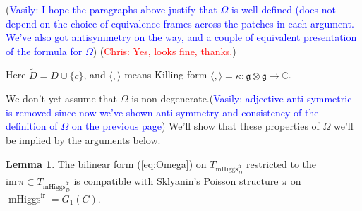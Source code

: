 \documentclass[11pt, oneside, reqno]{amsart}
\theoremstyle{definition} \newtheorem{definition}{Definition}[section]
\newtheorem{lemma}[definition]{Lemma}
\theoremstyle{definition} \newtheorem{remark}[definition]{Remark}
\theoremstyle{definition} \newtheorem{remarks}[definition]{Remarks}
\theoremstyle{definition} \newtheorem{question}[definition]{Question}
\theoremstyle{definition} \newtheorem*{note}{Note}
\theoremstyle{definition} \newtheorem{example}[definition]{Example}
\theoremstyle{definition} \newtheorem{examples}[definition]{Examples}
\renewcommand{\gg}{\mathfrak{g}}
\DeclareMathOperator{\mhiggs}{mHiggs}
\newcommand{\fr}{\mathrm{fr}}
\newcommand{\chris}[1]{(\textcolor{red}{Chris: #1})}
\newcommand{\vasily}[1]{(\textcolor{blue}{Vasily: #1})}
\begin{document}
\vasily{I hope the paragraphs above justify that $\Omega$ is well-defined
  (does not depend on the choice of equivalence frames across the patches
  in each argument. We've also got antisymmetry on the way, and a couple
of equivalent presentation of the formula for $\Omega$} \chris{Yes, looks fine, thanks.}


Here $\tilde D = D \cup \{ c \}$, and $\langle, \rangle$ means Killing form $\langle, \rangle = \kappa: \gg \otimes \gg \to \mathbb{C}$.

We don't yet assume that $\Omega$ is non-degenerate.\vasily{adjective
  anti-symmetric is removed since now we've shown anti-symmetry
  and consistency of the definition of $\Omega$ on the previous page} We'll show
that these properties of $\Omega$  we'll be implied by the arguments below.


\begin{lemma}\label{lemma:OmegaPi}
  The bilinear form (\ref{eq:Omega}) on $T_{\mhiggs^{\fr}_{D}}$ 
restricted to the $\mathrm{im} \, \pi \subset T_{\mhiggs^{\fr}_{D}}$  is compatible
  with Sklyanin's Poisson structure $\pi$ on $\mhiggs^{\fr} = G_1(C)$.
\end{lemma}
\end{document}
